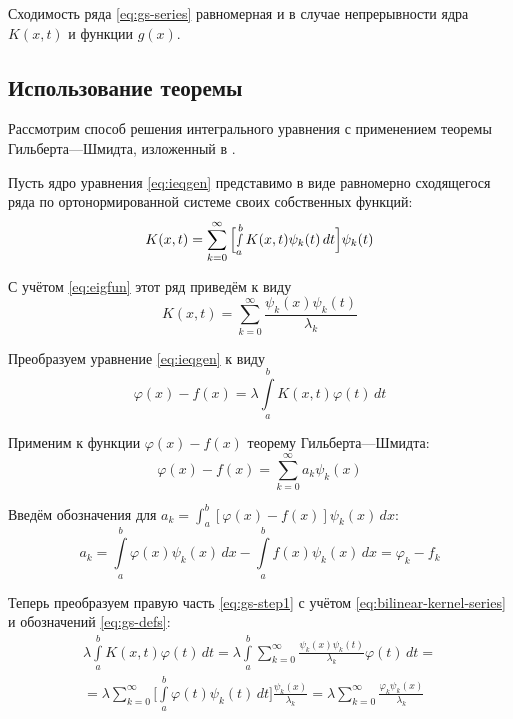 \documentclass{article}
\numberwithin{equation}{section}
\renewcommand{\phi}{\varphi}
\newcommand{\intl}{\int\limits}
\begin{document}
Сходимость ряда \eqref{eq:gs-series} равномерная и в случае
непрерывности ядра $K(x, t)$ и функции $g(x)$.

\subsection{Использование теоремы}
Рассмотрим способ решения интегрального уравнения с применением
теоремы Гильберта—Шмидта, изложенный в \cite{polyanin03}.

Пусть ядро уравнения \eqref{eq:ieqgen} представимо в виде равномерно
сходящегося ряда по ортонормированной системе своих собственных
функций:
\begin{equation}
  K(x, t) = \sum_{k=0}^{\infty}{\Bigl [ \smallint_a^b{K(x, t)\psi_k(t)\,
      dt} \Bigr ] \psi_k(t)}
\end{equation}

С учётом \eqref{eq:eigfun} этот ряд приведём к виду
\begin{equation}
  \label{eq:bilinear-kernel-series}
  K(x, t) = \sum_{k=0}^{\infty}{\frac{\psi_k(x)\psi_k(t)}{\lambda_k}}
\end{equation}

Преобразуем уравнение \eqref{eq:ieqgen} к виду
\begin{equation}
  \label{eq:gs-step1}
  \phi(x)-f(x) = \lambda \intl_a^b{K(x, t) \phi(t)\,dt}
\end{equation}

Применим к функции $\phi(x)-f(x)$ теорему Гильберта—Шмидта:
\begin{equation}
  \label{eq:gs-step2}
  \phi(x)-f(x) = \sum_{k=0}^{\infty}{a_k \psi_k(x)}
\end{equation}

Введём обозначения для $a_k = \int_a^b{[\phi(x)-f(x)]\psi_k(x)\,dx}$:
\begin{equation}
  \label{eq:gs-defs}
  a_k = \intl_a^b{\phi(x)\psi_k(x)\,dx} - \intl_a^b{f(x)\psi_k(x)\,dx}
  = \phi_k-f_k
\end{equation}

Теперь преобразуем правую часть \eqref{eq:gs-step1} с учётом
\eqref{eq:bilinear-kernel-series} и обозначений \eqref{eq:gs-defs}:
\begin{multline}
  \label{eq:gs-step3}
  \lambda\intl_a^b{K(x, t) \phi(t)\,dt} =
  \lambda \intl_a^b\sum_{k=0}^\infty{\frac{\psi_k(x)\psi_k(t)}{\lambda_k}\phi(t)\,dt} =\\
  = \lambda \sum_{k=0}^\infty \biggl [ \intl_a^b{\phi(t)\psi_k(t)\,dt}
  \biggr ] \frac{\psi_k(x)}{\lambda_k} = \lambda \sum_{k=0}^\infty
  \frac{\phi_k \psi_k(x)}{\lambda_k}
\end{multline}
\end{document}
